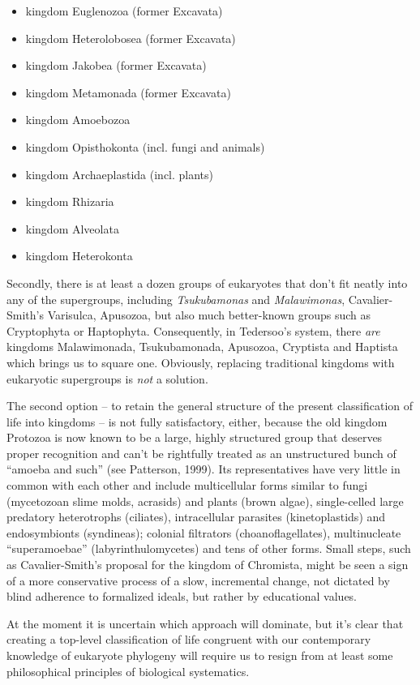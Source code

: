 \begin{artengenv}
\begin{itemize}
\item kingdom Euglenozoa (former Excavata)
\item kingdom Heterolobosea (former Excavata)
\item kingdom Jakobea (former Excavata)
\item kingdom Metamonada (former Excavata)
\item kingdom Amoebozoa
\item kingdom Opisthokonta (incl. fungi and animals)
\item kingdom Archaeplastida (incl. plants)
\item kingdom Rhizaria
\item kingdom Alveolata
\item kingdom Heterokonta
\end{itemize}
Secondly, there is at least a dozen groups of eukaryotes that don’t fit neatly into any of the supergroups, including
\textit{Tsukubamonas} and \textit{Malawimonas}, Cavalier-Smith’s Varisulca, Apusozoa, but also much better-known groups
such as Cryptophyta or Haptophyta. Consequently, in Tedersoo’s system, there \textit{are} kingdoms Malawimonada,
Tsukubamonada, Apusozoa, Cryptista and Haptista which brings us to square one. Obviously, replacing traditional
kingdoms with eukaryotic supergroups is \textit{not }a solution.

The second option – to retain the general structure of the present classification of life into kingdoms – is not fully
satisfactory, either, because the old kingdom Protozoa is now known to be a large, highly structured group that
deserves proper recognition and can’t be rightfully treated as an unstructured bunch of “amoeba and such”
\label{ref:RNDBkv0g8EycM}(see Patterson, 1999). Its representatives have very little in common with each other and
include multicellular forms similar to fungi (mycetozoan slime molds, acrasids) and plants (brown algae), single-celled
large predatory heterotrophs (ciliates), intracellular parasites (kinetoplastids) and endosymbionts (syndineas);
colonial filtrators (choanoflagellates), multinucleate “superamoebae” (labyrinthulomycetes) and tens of other forms.
Small steps, such as Cavalier-Smith’s proposal for the kingdom of Chromista, might be seen a sign of a more
conservative process of a slow, incremental change, not dictated by blind adherence to formalized ideals, but rather by
educational values.

At the moment it is uncertain which approach will dominate, but it’s clear that creating a top-level classification of
life congruent with our contemporary knowledge of eukaryote phylogeny will require us to resign from at least some
philosophical principles of biological systematics.


\end{artengenv}
